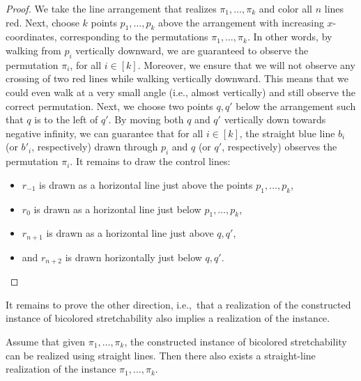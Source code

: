 \begin{proof}
    We take the line arrangement that realizes $\pi_1, \dots, \pi_k$ and color all $n$ lines red. Next, choose $k$ points $p_1, \dots, p_k$ above the arrangement with increasing $x$-coordinates, corresponding to the permutations $\pi_1, \dots, \pi_k$. In other words, by walking from $p_i$ vertically downward, we are guaranteed to observe the permutation $\pi_i$, for all $i \in [k]$. Moreover, we ensure that we will not observe any crossing of two red lines while walking vertically downward. This means that we could even walk at a very small angle (i.e., almost vertically) and still observe the correct permutation.
%
    Next, we choose two points $q, q'$ below the arrangement such that $q$ is to the left of $q'$. By moving both $q$ and $q'$ vertically down towards negative infinity, we can guarantee that for all $i \in [k]$, the straight blue line $b_i$ (or $b'_i$, respectively) drawn through $p_i$ and $q$ (or $q'$, respectively) observes the permutation $\pi_i$. It remains to draw the control lines:
    \begin{itemize}
        \item $r_{-1}$ is drawn as a horizontal line just above the points $p_1, \dots, p_k$,
        \item $r_0$ is drawn as a horizontal line just below $p_1, \dots, p_k$,
        \item $r_{n + 1}$ is drawn as a horizontal line just above $q, q'$,
        \item and $r_{n + 2}$ is drawn horizontally just below $q, q'$. \qedhere
    \end{itemize}   
\end{proof}
%
It remains to prove the other direction, i.e.,\ that a realization of the constructed instance of bicolored stretchability also implies a realization of the \AS instance.
%
\begin{lemma}
\label{lemma:bic_stretch_3}
    Assume that given $\pi_1, \dots, \pi_k$, the constructed instance of bicolored stretchability can be realized using straight lines. Then there also exists a straight-line realization of the \AS instance $\pi_1, \dots, \pi_k$. 
\end{lemma}
